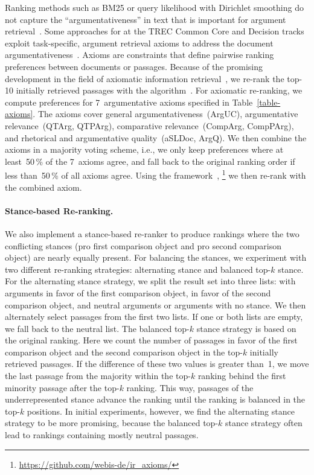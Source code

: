 Ranking methods such as BM25 or query likelihood with Dirichlet smoothing do not capture the ``argumentativeness'' in text that is important for argument retrieval~\cite{BondarenkoFKSGBPBSWPH2022}.
Some approaches for at the TREC Common Core and Decision tracks exploit task-specific, argument retrieval axioms to address the document argumentativeness~\cite{BondarenkoHVSPB2018,BondarenkoFKHVS2019}.
Axioms are constraints that define pairwise ranking preferences between documents or passages.
Because of the promising development in the field of axiomatic information retrieval~\cite{BondarenkoFRSVH2022}, we re-rank the top-10 initially retrieved passages with the \KwikSort algorithm~\cite{HagenVGS2016}.
For axiomatic re-ranking, we compute preferences for 7~argumentative axioms specified in Table~\ref{table-axioms}.
The axioms cover general argumentativeness~(ArgUC), argumentative relevance~(QTArg, QTPArg), comparative relevance~(CompArg, CompPArg), and rhetorical and argumentative quality~(aSLDoc, ArgQ).
We then combine the axioms in a majority voting scheme, i.e., we only keep preferences where at least~50\,\% of the 7~axioms agree, and fall back to the original ranking order if less than~50\,\% of all axioms agree.
Using the \iraxioms framework~\cite{BondarenkoFRSVH2022},%
\footnote{\url{https://github.com/webis-de/ir_axioms/}} we then re-rank with the combined axiom.

\paragraph{Stance-based Re-ranking.}

We also implement a stance-based re-ranker to produce rankings where the two conflicting stances (pro first comparison object and pro second comparison object) are nearly equally present.
For balancing the stances, we experiment with two different re-ranking strategies: \Ni alternating stance and \Nii balanced top-\(k\) stance.
For the alternating stance strategy, we split the result set into three lists: \Ni with arguments in favor of the first comparison object, \Nii in favor of the second comparison object, and \Niii neutral arguments or arguments with no stance.
We then alternately select passages from the first two lists. If one or both lists are empty, we fall back to the neutral list.
The balanced top-\(k\) stance strategy is based on the original ranking.
Here we count the number of passages in favor of the first comparison object and the second comparison object in the top-\(k\) initially retrieved passages.
If the difference of these two values is greater than~1, we move the last passage from the majority within the top-\(k\) ranking behind the first minority passage after the top-\(k\) ranking.
This way, passages of the underrepresented stance advance the ranking until the ranking is balanced in the top-\(k\) positions.
In initial experiments, however, we find the alternating stance strategy to be more promising, because the balanced top-\(k\) stance strategy often lead to rankings containing mostly neutral passages.

